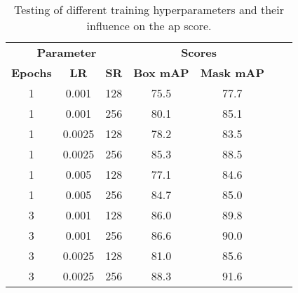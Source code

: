 \begin{table}
	\centering
	\caption[Detection evaluation]{Testing of different training hyperparameters and their influence on the \acrshort{ap} score.}
	\label{tab:detection_eval3}
	\begin{tabular}[htb]{ccccccc}
		\toprule
		\multicolumn{3}{c}{\textbf{Parameter} } & \multicolumn{2}{c}{\textbf{Scores} }                                                      \\
		\cmidrule(lr){1-3}                       \cmidrule(lr){4-5}
		\textbf{Epochs}                         & \textbf{LR}                          & \textbf{SR} & \textbf{Box mAP} & \textbf{Mask mAP} \\
		\midrule
		1                                       & 0.001                                & 128         & 75.5             & 77.7              \\
		1                                       & 0.001                                & 256         & 80.1             & 85.1              \\
		1                                       & 0.0025                               & 128         & 78.2             & 83.5              \\
		1                                       & 0.0025                               & 256         & 85.3             & 88.5              \\
		1                                       & 0.005                                & 128         & 77.1             & 84.6              \\
		1                                       & 0.005                                & 256         & 84.7             & 85.0              \\
		3                                       & 0.001                                & 128         & 86.0             & 89.8              \\
		3                                       & 0.001                                & 256         & 86.6             & 90.0              \\
		3                                       & 0.0025                               & 128         & 81.0             & 85.6              \\
		3                                       & 0.0025                               & 256         & 88.3             & 91.6              \\

\end{tabular}
\end{table}
